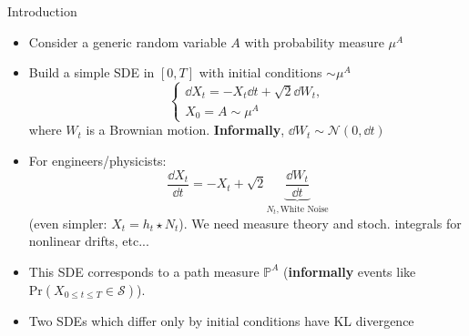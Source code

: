 \begin{frame}[allowframebreaks]{Introduction}
\begin{itemize}
    \item Consider a generic random variable $A$ with probability measure $\mu^A$
    \item Build a simple SDE in $[0,T]$ with initial conditions $\sim \mu^A$
    \begin{equation}\label{eq:diffsdes}
    \begin{cases}
    \dd X_t=-X_t\dd t+\sqrt{2}\dd W_t,\\
    X_0=A\sim \mu^A
    \end{cases}
    \end{equation}
    where $W_t$ is a Brownian motion. \textbf{Informally}, $\dd W_t\sim \mathcal{N}(0,\dd t)$
    \item For engineers/physicists:
    \begin{equation}\label{eq:diffsdes_s}
    \frac{\dd X_t}{\dd t}=-X_t+\sqrt{2}\underbrace{\frac{\dd W_t}{\dd t}}_{N_t,\text{White Noise}}
    \end{equation}
    (even simpler: $X_t=h_t\star N_t$). We need measure theory and stoch. integrals for nonlinear drifts, etc...


    \item This SDE corresponds to a path measure $\mathbb{P}^{A}$ (\textbf{informally} events like $\text{Pr}(X_{0\leq t\leq T}\in \mathcal{S})$). 

\framebreak

\item Two SDEs which differ only by initial conditions have KL divergence 


\end{itemize}
\end{frame}
